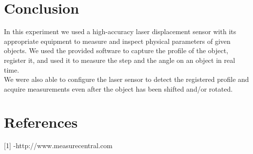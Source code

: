 \documentclass[english]{article}
\begin{document}
\section*{Conclusion}
In this experiment we used a high-accuracy laser displacement sensor with its appropriate equipment to measure and inspect physical parameters of given objects.
We used the provided software to capture the profile of the object, register it, and used it to measure the step and the angle on an object in real time. \\
We were also able to configure the laser sensor to detect the registered profile and acquire measurements even after the object has been shifted and/or rotated.\\

\section*{References}

{[}1{]} -http://www.measurecentral.com
\end{document}
